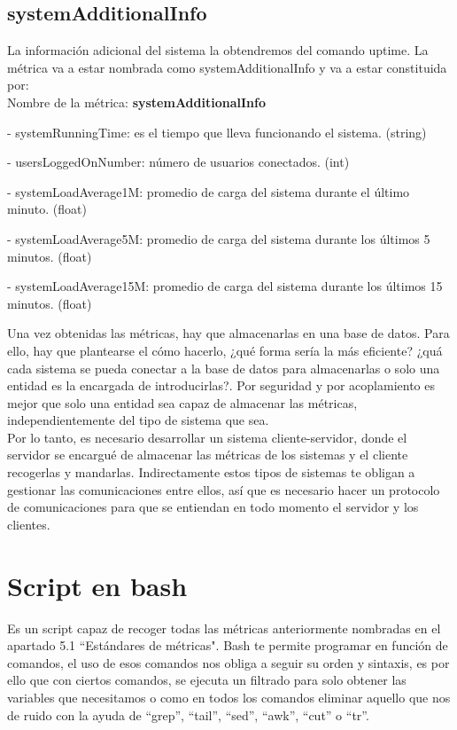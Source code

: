 \documentclass[ spanish, a4paper, 12pt, oneside]{report}
\begin{document}
\subsection{systemAdditionalInfo}
La información adicional del sistema la obtendremos del comando uptime.
La métrica va a estar nombrada como systemAdditionalInfo y va a estar constituida por:\\
  
Nombre de la métrica: \textbf{systemAdditionalInfo}

\hyp{} systemRunningTime: es el tiempo que lleva funcionando el sistema. (string)

\hyp{} usersLoggedOnNumber: número de usuarios conectados. (int)

\hyp{} systemLoadAverage1M: promedio de carga del sistema durante el último minuto. (float)

\hyp{} systemLoadAverage5M: promedio de carga del sistema durante los últimos 5 minutos. (float)

\hyp{} systemLoadAverage15M: promedio de carga del sistema durante los últimos 15 minutos. (float)

Una vez obtenidas las métricas, hay que almacenarlas en una base de datos. Para ello, hay que plantearse el cómo hacerlo, ¿qué forma 
sería la más eficiente? ¿quá cada sistema se pueda conectar a la base de datos para almacenarlas o solo una entidad es la encargada 
de introducirlas?. Por seguridad y por acoplamiento es mejor que solo una entidad sea capaz de almacenar las métricas, independientemente 
del tipo de sistema que sea.\\

Por lo tanto, es necesario desarrollar un sistema cliente-servidor, donde el servidor se encargué de almacenar las métricas de los sistemas 
y el cliente recogerlas y mandarlas. Indirectamente estos tipos de sistemas te obligan a gestionar las comunicaciones entre ellos, así que es necesario 
hacer un protocolo de comunicaciones para que se entiendan en todo momento el servidor y los clientes.\\

\section{Script en bash}

Es un script capaz de recoger todas las métricas anteriormente nombradas en el apartado 5.1 ``Estándares de métricas". Bash te permite programar en función de comandos, 
el uso de esos comandos nos obliga a seguir su orden y sintaxis, es por ello que con ciertos comandos, se ejecuta un filtrado para solo obtener las variables que necesitamos o 
como en todos los comandos eliminar aquello que nos de ruido con la ayuda de ``grep'', ``tail'', ``sed'', ``awk'', ``cut'' o ``tr''.\\
\end{document}
